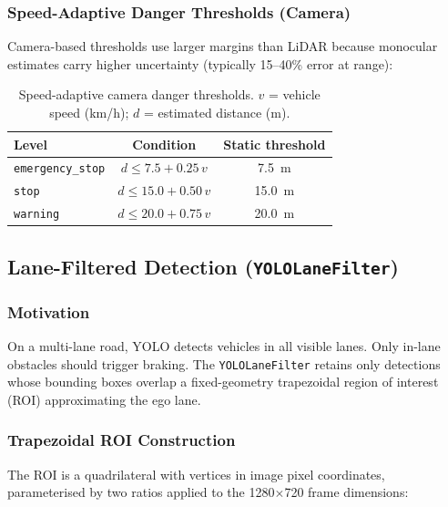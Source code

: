 \documentclass[12pt,a4paper]{article}
\begin{document}
\subsubsection{Speed-Adaptive Danger Thresholds (Camera)}

Camera-based thresholds use larger margins than LiDAR because monocular
estimates carry higher uncertainty (typically 15--40\% error at range):

\begin{table}[H]
\centering
\caption{Speed-adaptive camera danger thresholds.
  $v$ = vehicle speed (km/h); $d$ = estimated distance (m).}
\label{tab:camera_danger_thresholds}
\begin{tabular}{@{}lcc@{}}
\toprule
\textbf{Level} & \textbf{Condition} & \textbf{Static threshold} \\
\midrule
\texttt{emergency\_stop} & $d \le 7.5  + 0.25\,v$ & \SI{7.5}{\metre} \\
\texttt{stop}            & $d \le 15.0 + 0.50\,v$ & \SI{15.0}{\metre} \\
\texttt{warning}         & $d \le 20.0 + 0.75\,v$ & \SI{20.0}{\metre} \\
\bottomrule
\end{tabular}
\end{table}

\subsection{Lane-Filtered Detection (\texttt{YOLOLaneFilter})}
\label{subsec:lane_filter}

\subsubsection{Motivation}

On a multi-lane road, YOLO detects vehicles in all visible lanes.  Only
in-lane obstacles should trigger braking.  The \texttt{YOLOLaneFilter}
retains only detections whose bounding boxes overlap a fixed-geometry
trapezoidal region of interest (ROI) approximating the ego lane.

\subsubsection{Trapezoidal ROI Construction}

The ROI is a quadrilateral with vertices in image pixel coordinates,
parameterised by two ratios applied to the 1280$\times$720 frame dimensions:
\end{document}
